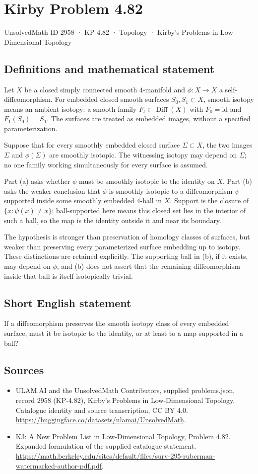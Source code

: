 \documentclass[11pt,a4paper]{article}
\begin{document}
\section*{Kirby Problem 4.82}\label{2958}
{\small UnsolvedMath ID 2958 · KP-4.82 · Topology · Kirby's Problems in Low-Dimensional Topology}
\subsection{Definitions and mathematical statement}
Let $X$ be a closed simply connected smooth $4$-manifold and
$\phi:X\to X$ a self-diffeomorphism. For embedded closed smooth
surfaces $S_0,S_1\subset X$, smooth isotopy means an ambient
isotopy: a smooth family $F_t\in\operatorname{Diff}(X)$ with
$F_0=\mathrm{id}$ and $F_1(S_0)=S_1$.
The surfaces are treated as embedded images, without a specified
parameterization.

Suppose that for every smoothly embedded closed surface
$\Sigma\subset X$, the two images $\Sigma$ and $\phi(\Sigma)$
are smoothly isotopic. The witnessing isotopy may depend on
$\Sigma$; no one family working simultaneously for every surface
is assumed.

Part (a) asks whether $\phi$ must be smoothly isotopic to the
identity on $X$. Part (b) asks the weaker conclusion that $\phi$
is smoothly isotopic to a diffeomorphism $\psi$ supported inside
some smoothly embedded $4$-ball in $X$. Support is the closure
of $\{x:\psi(x)\ne x\}$; ball-supported here means this closed
set lies in the interior of such a ball, so the map is the
identity outside it and near its boundary.

The hypothesis is stronger than preservation of homology classes
of surfaces, but weaker than preserving every parameterized surface
embedding up to isotopy. These distinctions are retained explicitly.
The supporting ball in (b), if it exists, may depend on $\phi$,
and (b) does not assert that the remaining diffeomorphism inside
that ball is itself isotopically trivial.
\subsection{Short English statement}
If a diffeomorphism preserves the smooth isotopy class of every embedded surface, must it be isotopic to the identity, or at least to a map supported in a ball?
\subsection{Sources}
\begin{itemize}
\item[S1] ULAM.AI and the UnsolvedMath Contributors, supplied problems.json, record 2958 (KP-4.82), Kirby's Problems in Low-Dimensional Topology. Catalogue identity and source transcription; CC BY 4.0.
\url{https://huggingface.co/datasets/ulamai/UnsolvedMath}.
\item[S2] K3: A New Problem List in Low-Dimensional Topology, Problem 4.82. Expanded formulation of the supplied catalogue statement.
\url{https://math.berkeley.edu/sites/default/files/surv-295-ruberman-watermarked-author-pdf.pdf}.
\end{itemize}
\end{document}
